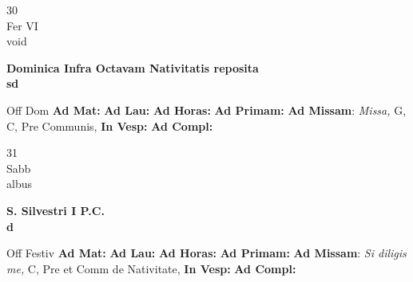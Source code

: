 \documentclass[10pt, openany]{book}
\begin{document}
    \begin{center}
        \begin{minipage}{3.5in}
            \vspace{2em}
            \begin{minipage}{0.5in}
                {\Huge 30} \\
                {\normalsize Fer VI} \\
                {\normalsize void}
            \end{minipage}
            \begin{minipage}{3.0in}
                \textbf{ \large Dominica Infra Octavam Nativitatis reposita \\
                \textnormal{\normalsize sd}} \\ 
            \end{minipage}
            \begin{justify}Off Dom
                \textbf{Ad Mat: }
                \textbf{Ad Lau: }
                \textbf{Ad Horas: }
                \textbf{Ad Primam: }\textbf{Ad Missam}: \textit{Missa,} G, C, Pre Communis,  
                \textbf{In Vesp: }
                \textbf{Ad Compl: }
            \end{justify}
        \end{minipage}
    \end{center}

    \begin{center}
        \begin{minipage}{3.5in}
            \vspace{2em}
            \begin{minipage}{0.5in}
                {\Huge 31} \\
                {\normalsize Sabb} \\
                {\normalsize albus}
            \end{minipage}
            \begin{minipage}{3.0in}
                \textbf{ \large S. Silvestri I P.C. \\
                \textnormal{\normalsize d}} \\ 
            \end{minipage}
            \begin{justify}Off Festiv
                \textbf{Ad Mat: }
                \textbf{Ad Lau: }
                \textbf{Ad Horas: }
                \textbf{Ad Primam: }\textbf{Ad Missam}: \textit{Si diligis me,} C, Pre et Comm de Nativitate,  
                \textbf{In Vesp: }
                \textbf{Ad Compl: }
            \end{justify}
        \end{minipage}
    \end{center}
\end{document}
